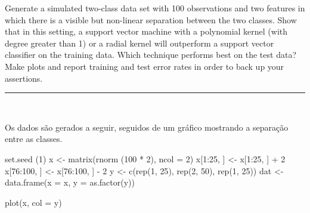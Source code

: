 \documentclass[
  a4paperpaper,
]{article}
\newenvironment{Shaded}{\begin{snugshade}}{\end{snugshade}}
\newcommand{\AttributeTok}[1]{\textcolor[rgb]{0.40,0.45,0.13}{#1}}
\newcommand{\DecValTok}[1]{\textcolor[rgb]{0.68,0.00,0.00}{#1}}
\newcommand{\FunctionTok}[1]{\textcolor[rgb]{0.28,0.35,0.67}{#1}}
\newcommand{\NormalTok}[1]{\textcolor[rgb]{0.00,0.23,0.31}{#1}}
\newcommand{\OtherTok}[1]{\textcolor[rgb]{0.00,0.23,0.31}{#1}}
\newcommand{\SpecialCharTok}[1]{\textcolor[rgb]{0.37,0.37,0.37}{#1}}
\begin{document}
Generate a simulated two-class data set with 100 observations and two
features in which there is a visible but non-linear separation between
the two classes. Show that in this setting, a support vector machine
with a polynomial kernel (with degree greater than 1) or a radial kernel
will outperform a support vector classifier on the training data. Which
technique performs best on the test data? Make plots and report training
and test error rates in order to back up your assertions.

\begin{center}\rule{0.5\linewidth}{0.5pt}\end{center}

~

Os dados são gerados a seguir, seguidos de um gráfico mostrando a
separação entre as classes.

\begin{Shaded}
\begin{Highlighting}[]
\FunctionTok{set.seed}\NormalTok{ (}\DecValTok{1}\NormalTok{)}
\NormalTok{x }\OtherTok{\textless{}{-}} \FunctionTok{matrix}\NormalTok{(}\FunctionTok{rnorm}\NormalTok{ (}\DecValTok{100} \SpecialCharTok{*} \DecValTok{2}\NormalTok{), }\AttributeTok{ncol =} \DecValTok{2}\NormalTok{)}
\NormalTok{x[}\DecValTok{1}\SpecialCharTok{:}\DecValTok{25}\NormalTok{, ] }\OtherTok{\textless{}{-}}\NormalTok{ x[}\DecValTok{1}\SpecialCharTok{:}\DecValTok{25}\NormalTok{, ] }\SpecialCharTok{+} \DecValTok{2}
\NormalTok{x[}\DecValTok{76}\SpecialCharTok{:}\DecValTok{100}\NormalTok{, ] }\OtherTok{\textless{}{-}}\NormalTok{ x[}\DecValTok{76}\SpecialCharTok{:}\DecValTok{100}\NormalTok{, ] }\SpecialCharTok{{-}} \DecValTok{2}
\NormalTok{y }\OtherTok{\textless{}{-}} \FunctionTok{c}\NormalTok{(}\FunctionTok{rep}\NormalTok{(}\DecValTok{1}\NormalTok{, }\DecValTok{25}\NormalTok{), }\FunctionTok{rep}\NormalTok{(}\DecValTok{2}\NormalTok{, }\DecValTok{50}\NormalTok{), }\FunctionTok{rep}\NormalTok{(}\DecValTok{1}\NormalTok{, }\DecValTok{25}\NormalTok{))}
\NormalTok{dat }\OtherTok{\textless{}{-}} \FunctionTok{data.frame}\NormalTok{(}\AttributeTok{x =}\NormalTok{ x, }\AttributeTok{y =} \FunctionTok{as.factor}\NormalTok{(y))}

\FunctionTok{plot}\NormalTok{(x, }\AttributeTok{col =}\NormalTok{ y)}
\end{Highlighting}
\end{Shaded}
\end{document}
